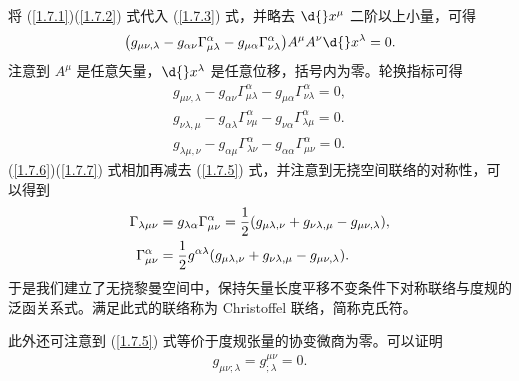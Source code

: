 \documentclass[UTF8, 12pt, a4paper, oneside, onecolumn, fontset=none]{ctexart}
\begin{document}
将 (\ref{1.7.1})(\ref{1.7.2}) 式代入 (\ref{1.7.3}) 式，并略去 $\d{}x^{\mu}$ 二阶以上小量，可得
\begin{equation}
\mleft(g_{\mu\nu,\lambda}-g_{\alpha\nu}\Gamma_{\mu\lambda}^{\alpha}-g_{\mu\alpha}\Gamma_{\nu\lambda}^{\alpha}\mright) A^{\mu}A^{\nu}\d{}x^{\lambda}=0.
\end{equation}
注意到 $A^{\mu}$ 是任意矢量，$\d{}x^{\lambda}$ 是任意位移，括号内为零。轮换指标可得
\begin{align}
g_{\mu\nu,\lambda}-g_{\alpha\nu}\Gamma_{\mu\lambda}^{\alpha}-g_{\mu\alpha}\Gamma_{\nu\lambda}^{\alpha}=0,\label{1.7.5}\\
g_{\nu\lambda,\mu}-g_{\alpha\lambda}\Gamma_{\nu\mu}^{\alpha}-g_{\nu\alpha}\Gamma_{\lambda\mu}^{\alpha}=0.\label{1.7.6}\\
g_{\lambda\mu,\nu}-g_{\alpha\mu}\Gamma_{\lambda\nu}^{\alpha}-g_{\alpha\alpha}\Gamma_{\mu\nu}^{\alpha}=0.\label{1.7.7}
\end{align}
(\ref{1.7.6})(\ref{1.7.7}) 式相加再减去 (\ref{1.7.5}) 式，并注意到无挠空间联络的对称性，可以得到
\begin{align}
\Gamma_{\lambda\mu\nu}&=g_{\lambda\alpha}\Gamma_{\mu\nu}^{\alpha}=\frac{1}{2}\mleft(g_{\mu\lambda,\nu}+g_{\nu\lambda,\mu}-g_{\mu\nu,\lambda}\mright),\\
\Gamma_{\mu\nu}^{\alpha}&=\frac{1}{2}g^{\alpha\lambda}\mleft(g_{\mu\lambda,\nu}+g_{\nu\lambda,\mu}-g_{\mu\nu,\lambda}\mright).
\end{align}
于是我们建立了无挠黎曼空间中，保持矢量长度平移不变条件下对称联络与度规的泛函关系式。满足此式的联络称为 Christoffel 联络，简称克氏符。

此外还可注意到 (\ref{1.7.5}) 式等价于度规张量的协变微商为零。可以证明
\begin{align}
g_{\mu\nu;\lambda}=g^{\mu\nu}_{;\lambda}=0.
\end{align}
\end{document}
